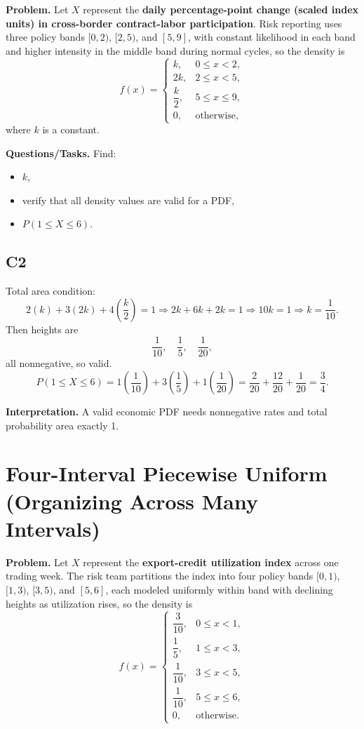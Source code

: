 \textbf{Problem.}
Let $X$ represent the \textbf{daily percentage-point change (scaled index units) in cross-border contract-labor participation}. Risk reporting uses three policy bands $[0,2)$, $[2,5)$, and $[5,9]$, with constant likelihood in each band and higher intensity in the middle band during normal cycles, so the density is
\[
f(x)=
\begin{cases}
k, & 0\le x<2,\\
2k, & 2\le x<5,\\
\dfrac{k}{2}, & 5\le x\le 9,\\
0, & \text{otherwise,}
\end{cases}
\]
where $k$ is a constant.

\textbf{Questions/Tasks.}
Find:
\begin{itemize}
    \item[(a)] $k$,
    \item[(b)] verify that all density values are valid for a PDF,
    \item[(c)] $P(1\le X\le 6)$.
\end{itemize}

\subsection*{C2}
Total area condition:
\[
2(k)+3(2k)+4\left(\frac{k}{2}\right)=1
\Rightarrow 2k+6k+2k=1
\Rightarrow 10k=1
\Rightarrow k=\frac{1}{10}.
\]
Then heights are
\[
\frac{1}{10},\quad \frac{1}{5},\quad \frac{1}{20},
\]
all nonnegative, so valid.
\[
P(1\le X\le 6)=1\left(\frac{1}{10}\right)+3\left(\frac{1}{5}\right)+1\left(\frac{1}{20}\right)
=\frac{2}{20}+\frac{12}{20}+\frac{1}{20}=\frac{3}{4}.
\]

\textbf{Interpretation.}
A valid economic PDF needs nonnegative rates and total probability area exactly 1.

\section{Four-Interval Piecewise Uniform (Organizing Across Many Intervals)}

\textbf{Problem.}
Let $X$ represent the \textbf{export-credit utilization index} across one trading week. The risk team partitions the index into four policy bands $[0,1)$, $[1,3)$, $[3,5)$, and $[5,6]$, each modeled uniformly within band with declining heights as utilization rises, so the density is
\[
f(x)=
\begin{cases}
\dfrac{3}{10}, & 0\le x<1,\\
\dfrac{1}{5}, & 1\le x<3,\\
\dfrac{1}{10}, & 3\le x<5,\\
\dfrac{1}{10}, & 5\le x\le 6,\\
0, & \text{otherwise.}
\end{cases}
\]

